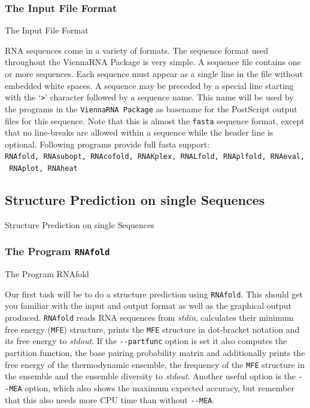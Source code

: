 \documentclass[]{article}
\newcommand\todo[1]{\color{red}#1\color{black}}
\begin{document}
\subsubsection{The Input File Format}{The Input File Format}\label{the-input-file-format}

RNA sequences come in a variety of formats. The sequence format used
throughout the ViennaRNA Package is very simple. A sequence file
contains one or more sequences. Each sequence must appear as a single
line in the file without embedded white spaces. A sequence may be
preceded by a special line starting with the `\texttt{\textgreater{}}'
character followed by a sequence name. This name will be used by the
programs in the \texttt{ViennaRNA\ Package} as basename for the
PostScript output files for this sequence. Note that this is almost the
\texttt{fasta} sequence format, except that no line-breaks are allowed
within a sequence while the header line is optional. Following programs
provide full fasta support:
\texttt{RNAfold,\ RNAsubopt,\ RNAcofold,\ RNAKplex,\ RNALfold,\ RNAplfold,\ RNAeval,\ RNAplot,\ RNAheat}

\subsection{Structure Prediction on single Sequences}{Structure Prediction on single Sequences}\label{structure-prediction-on-single-sequences}

\subsubsection{The Program \texttt{RNAfold}}{The Program RNAfold}\label{the-program-rnafold}

Our first task will be to do a structure prediction using
\texttt{RNAfold}. This should get you familiar with the input and output
format as well as the graphical output produced. \texttt{RNAfold} reads
RNA sequences from \emph{stdin}, calculates their minimum free energy
(\texttt{MFE}) structure, prints the \texttt{MFE} structure in
dot-bracket notation and its free energy to \emph{stdout}. If the
\texttt{-\/-partfunc} option is set it also computes the partition function, the
base pairing probability matrix and additionally prints the free energy
of the thermodynamic ensemble, the frequency of the \texttt{MFE}
structure in the ensemble and the ensemble diversity \todo{to \emph{stdout}}.
Another useful option is the \texttt{-\/-MEA} option, which also shows
the maximum expected accuracy, but remember that this also needs more
CPU time than without \texttt{-\/-MEA}.
\end{document}
